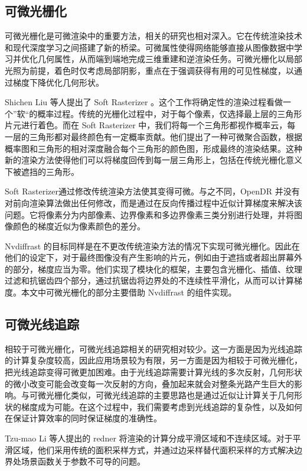 \subsection{可微光栅化}

可微光栅化是可微渲染中的重要方法，相关的研究也相对深入。它在传统渲染技术和现代深度学习之间搭建了新的桥梁。可微属性使得网络能够直接从图像数据中学习并优化几何属性，从而端到端地完成三维重建和逆渲染任务。可微光栅化以局部光照为前提，着色时仅考虑局部阴影，重点在于强调获得有用的可见性梯度，以通过梯度下降优化几何形状。

Shichen Liu 等人提出了 Soft Rasterizer \cite{softraster}。这个工作将确定性的渲染过程看做一个”软“的概率过程。传统的光栅化过程中，对于每个像素，仅选择最上层的三角形片元进行着色。而在 Soft Rasterizer 中，我们将每一个三角形都视作概率云，每一层的三角形都对最终颜色有一定概率贡献。他们提出了一种可微聚合函数，根据概率图和三角形的相对深度融合每个三角形的颜色图，形成最终的渲染结果。这种新的渲染方法使得他们可以将梯度回传到每一层三角形上，包括在传统光栅化意义下被遮挡的三角形。

Soft Rasterizer通过修改传统渲染方法使其变得可微。与之不同，OpenDR \cite{OpenDR} 并没有对前向渲染算法做出任何修改，而是通过在反向传播过程中近似计算梯度来解决该问题。它将像素分为内部像素、边界像素和多边界像素三类分别进行处理，并将图像颜色的梯度近似为像素颜色的差分。

Nvdiffrast \cite{nvdiffrast} 的目标同样是在不更改传统渲染方法的情况下实现可微光栅化。因此在他们的设定下，对于最终图像没有产生影响的片元，例如由于遮挡或者超出屏幕外的部分，梯度应当为零。他们实现了模块化的框架，主要包含光栅化、插值、纹理过滤和抗锯齿四个部分，通过抗锯齿将边界处的不连续性平滑化，从而可以计算梯度。本文中可微光栅化的部分主要借助 Nvdiffrast 的组件实现。

\subsection{可微光线追踪}

相较于可微光栅化，可微光线追踪相关的研究相对较少。这一方面是因为光线追踪的计算复杂度较高，因此应用场景较为有限，另一方面是因为相较于可微光栅化，把光线追踪变得可微更加困难。由于光线追踪需要计算光线的多次反射，几何形状的微小改变可能会改变每一次反射的方向，叠加起来就会对整条光路产生巨大的影响。与可微光栅化类似，可微光线追踪的主要思路也是通过近似让计算关于几何形状的梯度成为可能。在这个过程中，我们需要考虑到光线追踪的复杂性，以及如何在保证计算效率的同时保证梯度的准确性。

Tzu-mao Li 等人提出的 redner \cite{DiffMCRT} 将渲染的计算分成平滑区域和不连续区域。对于平滑区域，他们采用传统的面积采样方式，并通过边采样替代面积采样的方式解决边界处场景函数关于参数不可导的问题。

